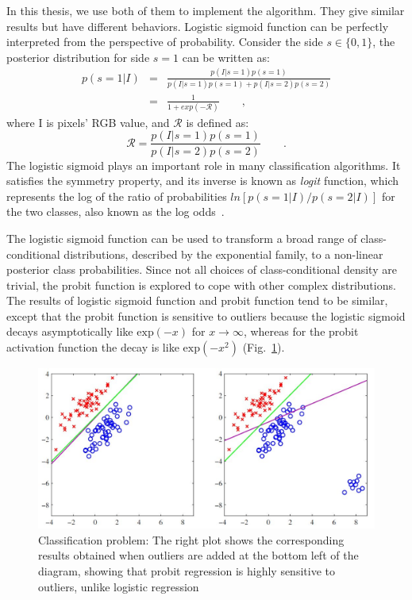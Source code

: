 In this thesis, we use both of them to implement the algorithm. They give
similar results but have different behaviors. Logistic sigmoid function
can be perfectly interpreted from the perspective of
probability. Consider the side $s \in \{0,1\}$, the posterior
distribution for side $s = 1$ can be written as:
\begin{eqnarray}
  \label{eq:pdfs}
  p(s=1|I) &=& \frac{p(I|s=1)p(s=1)}{p(I|s=1)p(s=1)
    + p(I|s=2)p(s=2)}\\
&=&  \frac{1}{1+exp(-\mathcal{R})}\qquad,
\end{eqnarray}
where I is pixels' RGB value, and $\mathcal{R}$ is defined as:
\begin{equation}
  \label{eq:ratio}
  \mathcal{R} = \frac{p(I|s=1)p(s=1)}{p(I|s=2)p(s=2)}\qquad.
\end{equation}
The logistic sigmoid plays an important role in many classification
algorithms. It satisfies the symmetry property, and its inverse 
is known as \textit{logit} function, which represents the log of the
ratio of probabilities $ln [p(s=1|I)/p(s=2|I)]$ for the two classes,
also known as the log odds~\cite{bishop2006pattern}.

The logistic sigmoid function can be used to transform a broad range
of class-conditional distributions, described by the exponential
family, to a non-linear posterior class probabilities. Since not all choices of
class-conditional density are trivial, the probit function is explored
to cope with other complex distributions. The results of logistic
sigmoid function and probit function tend to be similar, except that the
probit function is sensitive to outliers because the logistic sigmoid
decays asymptotically like $\mathrm{exp}(-x)$ for $x \rightarrow \infty$, whereas
for the probit activation function the decay is like
$\mathrm{exp}(-x^2)$ (Fig.~\ref{fig:outliers}).
\begin{figure} 
  \includegraphics[width=\linewidth]{images/outliers.jpg}
\caption[Classification problem]{Classification problem: The
  right plot shows the corresponding results obtained when outliers
  are added at the bottom left of the diagram, showing  that probit
  regression is highly sensitive to outliers, unlike logistic
  regression~\cite{bishop2006pattern}}
\label{fig:outliers}
\end{figure}

